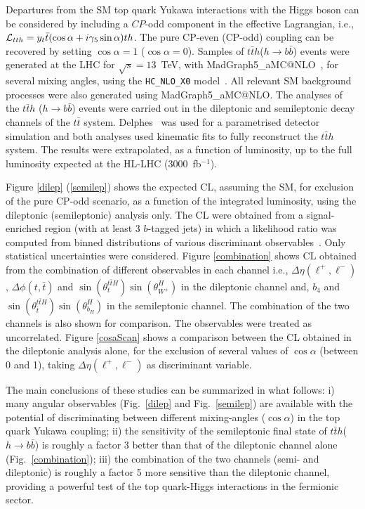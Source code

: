 \documentclass[../report.tex]{subfiles}
\begin{document}
Departures from the SM top quark Yukawa interactions with the Higgs boson can be considered by including a $CP$-odd component in the effective Lagrangian, i.e., ${\cal L}_{tth}=y_t\bar t (\cos\alpha+i\gamma_5\sin\alpha)t h$. The pure CP-even (CP-odd) coupling can be recovered by setting $\cos\alpha=1$ ($\cos\alpha=0$). Samples of $t\bar t h$($h\rightarrow b\bar{b}$) events were generated at the LHC for $\sqrt{s}=13$~TeV, with {\sc MadGraph5\_aMC@NLO}~\cite{Alwall:2014hca}, for several mixing angles, using the \texttt{HC\_NLO\_X0} model~\cite{Artoisenet:2013puc}. All relevant SM background processes were also generated using {\sc MadGraph5\_aMC@NLO}. The analyses of the $t\bar t h$ ($h\rightarrow b\bar b$) events were carried out in the dileptonic and semileptonic decay channels of the $t\bar t$ system. Delphes~\cite{deFavereau:2013fsa} was used for a parametrised detector simulation and both analyses used kinematic fits to fully reconstruct the $t\bar t h$ system. The results were extrapolated, as a function of luminosity, up to the full luminosity expected at the HL-LHC (3000~fb$^{-1}$).

Figure \ref{dilep} (\ref{semilep}) shows the expected CL, assuming the SM, for exclusion of the pure CP-odd scenario, as a function of the integrated luminosity, using the dileptonic (semileptonic) analysis only. The CL were obtained from a signal-enriched region (with at least 3 $b$-tagged jets) in which a likelihood ratio was computed from binned distributions of various discriminant observables~\cite{AmorDosSantos:2017ayi, Demartin:2014fia}. Only statistical uncertainties were considered. Figure \ref{combination} shows CL obtained from the combination of different observables in each channel i.e., $\Delta\eta(\ell^+,\ell^-)$, $\Delta\phi(t,\bar t)$ and $\sin(\theta^{t\bar tH}_{t})\sin(\theta^{H}_{W^+})$ in the dileptonic channel and, $b_4$ and $\sin(\theta^{t\bar tH}_{\bar t})\sin(\theta^{H}_{b_H})$ in the semileptonic channel. The combination of the two channels is also shown for comparison. The observables were treated as uncorrelated. Figure \ref{cosaScan} shows a comparison between the CL obtained in the dileptonic analysis alone, for the exclusion of several values of $\cos\alpha$ (between 0 and 1), taking $\Delta\eta(\ell^+,\ell^-)$ as discriminant variable.

The main conclusions of these studies can be summarized in what follows: i) many angular observables (Fig.~\ref{dilep} and Fig.~\ref{semilep}) are available with the potential of discriminating between different mixing-angles ($\cos\alpha$) in the top quark Yukawa coupling; ii) the sensitivity of the semileptonic final state of $t\bar{t}h$($h\rightarrow b\bar{b}$) is roughly a factor 3 better than that of the dileptonic channel alone (Fig.~\ref{combination}); iii) the combination of the two channels (semi- and dileptonic) is roughly a factor 5 more sensitive than the dileptonic channel, providing a powerful test of the top quark-Higgs interactions in the fermionic sector.
\end{document}
